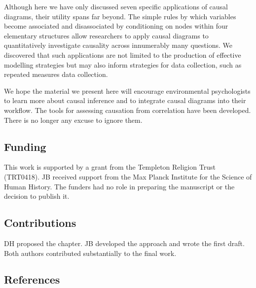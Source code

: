 \documentclass[
  singlecolumn]{article}
\begin{document}
Although here we have only discussed seven specific applications of
causal diagrams, their utility spans far beyond. The simple rules by
which variables become associated and disassociated by conditioning on
nodes within four elementary structures allow researchers to apply
causal diagrams to quantitatively investigate causality across
innumerably many questions. We discovered that such applications are not
limited to the production of effective modelling strategies but may also
inform strategies for data collection, such as repeated measures data
collection.

We hope the material we present here will encourage environmental
psychologists to learn more about causal inference and to integrate
causal diagrams into their workflow. The tools for assessing causation
from correlation have been developed. There is no longer any excuse to
ignore them.

\newpage{}

\subsection{Funding}\label{funding}

This work is supported by a grant from the Templeton Religion Trust
(TRT0418). JB received support from the Max Planck Institute for the
Science of Human History. The funders had no role in preparing the
manuscript or the decision to publish it.

\subsection{Contributions}\label{contributions}

DH proposed the chapter. JB developed the approach and wrote the first
draft. Both authors contributed substantially to the final work.

\subsection{References}\label{references}
\end{document}
